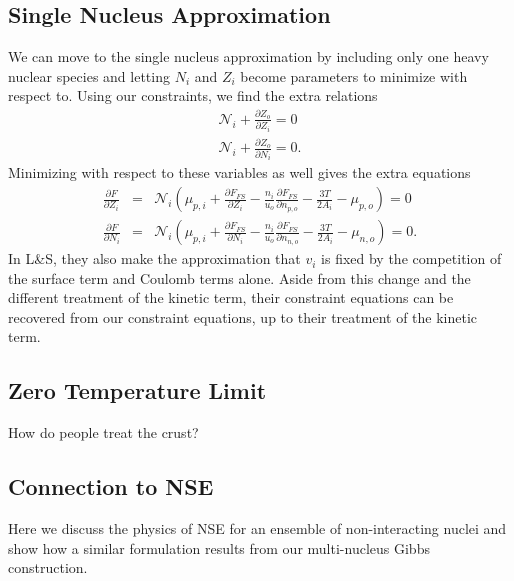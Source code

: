 \documentclass[11pt,letter]{article}
\begin{document}
\subsection{Single Nucleus Approximation}
We can move to the single nucleus approximation by including only one heavy nuclear
species and letting $N_i$ and $Z_i$ become parameters to minimize with respect to.
Using our constraints, we find the extra relations 
\begin{eqnarray}
\mathcal{N}_i  + \frac{\partial Z_o}{\partial Z_i} = 0 \\
\mathcal{N}_i  + \frac{\partial Z_o}{\partial N_i} = 0.
\end{eqnarray}
Minimizing with respect to these variables as well gives the extra equations 
\begin{eqnarray}
\frac{\partial F}{\partial Z_i} &=& \mathcal{N}_i \left(\mu_{p,i} + 
\frac{\partial F_{FS}}{\partial Z_i} 
- \frac{n_i}{u_o} \frac{\partial F_{FS}}{\partial n_{p,o}}  
- \frac{3 T}{2 A_i} - \mu_{p,o} \right) = 0 \\
\frac{\partial F}{\partial N_i} &=& \mathcal{N}_i \left(\mu_{p,i} + 
\frac{\partial F_{FS}}{\partial N_i}
- \frac{n_i}{u_o} \frac{\partial F_{FS}}{\partial n_{n,o}}  
- \frac{3 T}{2 A_i} - \mu_{n,o} \right) = 0.
\end{eqnarray}
In L\&S, they also make the approximation that $v_i$ is fixed by the competition
of the surface term and Coulomb terms alone. Aside from this change and the 
different treatment of the kinetic term, their 
constraint equations can be recovered from our constraint equations, up to their 
treatment of the kinetic term. 

\subsection{Zero Temperature Limit}
How do people treat the crust?

\subsection{Connection to NSE} 
Here we discuss the physics of NSE for an ensemble of non-interacting nuclei and
show how a similar formulation results from our multi-nucleus Gibbs
construction.  
\end{document}
